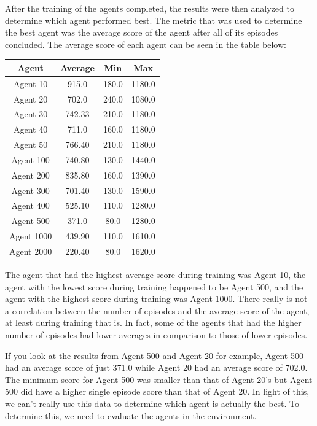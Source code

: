 \documentclass[
	a4paper, %
	10pt, %
	unnumberedsections, %
	twoside, %
]{LTJournalArticle}
\begin{document}
After the training of the agents completed, the results were then analyzed to determine which agent performed best. The metric that was used to determine the best agent was the average score of the agent
after all of its episodes concluded. The average score of each agent can be seen in the table below:

\begin{center}
	\begin{tabular}[ht]{|c|c|c|c|}
		\hline \textbf{Agent} & \textbf{Average} & \textbf{Min} & \textbf{Max} \\ \hline
		Agent 10 & 915.0 & 180.0 & 1180.0 \\ \hline
		Agent 20 & 702.0 & 240.0 & 1080.0 \\ \hline
		Agent 30 & 742.33 & 210.0 & 1180.0 \\ \hline
		Agent 40 & 711.0 & 160.0 & 1180.0 \\ \hline
		Agent 50 & 766.40 & 210.0 & 1180.0 \\ \hline
		Agent 100 & 740.80 & 130.0 & 1440.0 \\ \hline
		Agent 200 & 835.80 & 160.0 & 1390.0 \\ \hline
		Agent 300 & 701.40 & 130.0 & 1590.0 \\ \hline
		Agent 400 & 525.10 & 110.0 & 1280.0 \\ \hline
		Agent 500 & 371.0 & 80.0 & 1280.0 \\ \hline
		Agent 1000 & 439.90 & 110.0 & 1610.0 \\ \hline
		Agent 2000 & 220.40 & 80.0 & 1620.0 \\ \hline
	\end{tabular}
\end{center}

The agent that had the highest average score during training was Agent 10, the agent with the lowest score during training happened to be Agent 500, and the agent with the highest score during training was
Agent 1000. There really is not a correlation between the number of episodes and the average score of the agent, at least during training that is. In fact, some of the agents that had the higher number of
episodes had lower averages in comparison to those of lower episodes.

If you look at the results from Agent 500 and Agent 20 for example, Agent 500 had an average score of just 371.0 while Agent 20 had an average score of 702.0. The minimum score for Agent 500 was
smaller than that of Agent 20's but Agent 500 did have a higher single episode score than that of Agent 20. In light of this, we can't really use this data to determine which agent is actually the best.
To determine this, we need to evaluate the agents in the environment.
\end{document}
